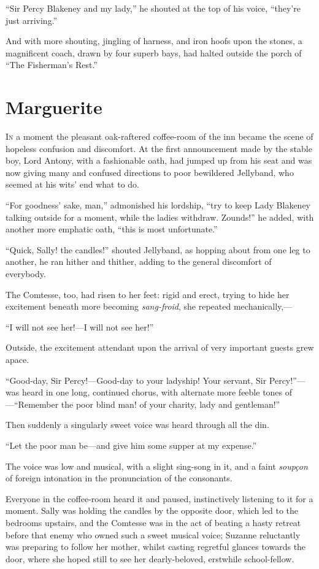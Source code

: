 \documentclass[paper=5.5in:8.5in,BCOR=7mm,twoside,DIV=calc,12pt,usegeometry,chapterprefix,endperiod,headings=big]{scrbook}
\begin{document}
\enquote{Sir Percy Blakeney and my lady,} he shouted at the top of his voice, \enquote{they're just arriving.}

And with more shouting, jingling of harness, and iron hoofs upon the stones, a magnificent coach, drawn by four superb bays, had halted outside the porch of \enquote{The Fisherman's Rest.}

\chapter{Marguerite}
\lettrine[lines=4]{I}{n} a moment the pleasant oak-raftered coffee-room of the inn became the scene of hopeless confusion and discomfort. At the first announcement made by the stable boy, Lord Antony, with a fashionable oath, had jumped up from his seat and was now giving many and confused directions to poor bewildered Jellyband, who seemed at his wits’ end what to do.

\enquote{For goodness’ sake, man,} admonished his lordship, \enquote{try to keep Lady Blakeney talking outside for a moment, while the ladies withdraw. Zounds!} he added, with another more emphatic oath, \enquote{this is most unfortunate.}

\enquote{Quick, Sally! the candles!} shouted Jellyband, as hopping about from one leg to another, he ran hither and thither, adding to the general discomfort of everybody.

The Comtesse, too, had risen to her feet: rigid and erect, trying to hide her excitement beneath more becoming \textit{sang-froid}, she repeated mechanically,---

\enquote{I will not see her!---I will not see her!}

Outside, the excitement attendant upon the arrival of very important guests grew apace.

\enquote{Good-day, Sir Percy!---Good-day to your ladyship! Your servant, Sir Percy!}---was heard in one long, continued chorus, with alternate more feeble tones of---\enquote{Remember the poor blind man! of your charity, lady and gentleman!}

Then suddenly a singularly sweet voice was heard through all the din.

\enquote{Let the poor man be---and give him some supper at my expense.}

The voice was low and musical, with a slight sing-song in it, and a faint \textit{soupçon} of foreign intonation in the pronunciation of the consonants.

Everyone in the coffee-room heard it and paused, instinctively listening to it for a moment. Sally was holding the candles by the opposite door, which led to the bedrooms upstairs, and the Comtesse was in the act of beating a hasty retreat before that enemy who owned such a sweet musical voice; Suzanne reluctantly was preparing to follow her mother, whilst casting regretful glances towards the door, where she hoped still to see her dearly-beloved, erstwhile school-fellow.
\end{document}
